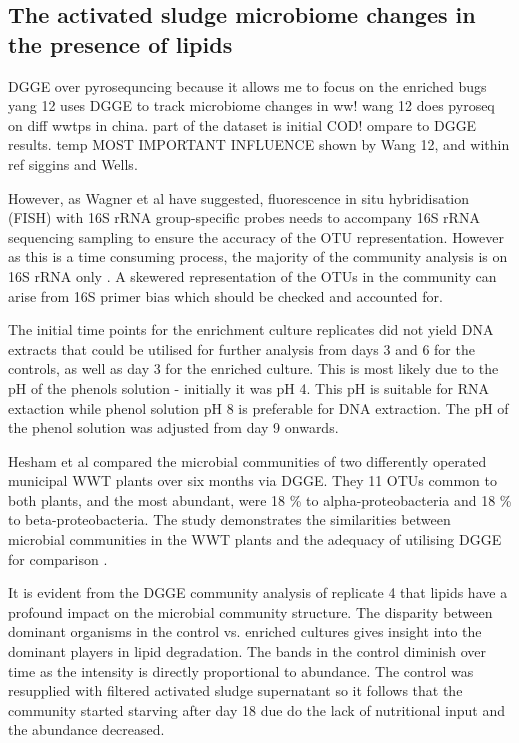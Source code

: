 \documentclass[11pt]{article}
\begin{document}
\subsection{The activated sludge microbiome changes in the presence of lipids}
DGGE over pyrosequncing because it allows me to focus on the enriched bugs
yang 12 uses DGGE to track microbiome changes in ww!
wang 12 does pyroseq on diff wwtps in china. part of the dataset is initial COD! ompare to DGGE results. temp MOST IMPORTANT INFLUENCE shown by Wang 12, and within ref siggins and Wells.

However, as Wagner et al have suggested, fluorescence in situ hybridisation (FISH) with 16S rRNA  group-specific probes needs to accompany 16S rRNA sequencing sampling to ensure the accuracy of the OTU representation. However as this is a time consuming process, the majority of the community analysis is on 16S rRNA only \cite{Wagner_02} . A skewered representation of the OTUs in the community can arise from 16S primer bias which should be checked and accounted for.

The initial time points for the enrichment culture replicates did not yield DNA extracts that could be utilised for further analysis from days 3 and 6 for the controls, as well as day 3 for the enriched culture. This is most likely due to the pH of the phenols solution - initially it was pH 4. This pH is suitable for RNA extaction while phenol solution pH 8 is preferable for DNA extraction. The pH of the phenol solution was adjusted from day 9 onwards.

Hesham et al compared the microbial communities of two differently operated municipal WWT plants over six months via DGGE. They 11 OTUs common to both plants, and the most abundant, were 18 \% to alpha-proteobacteria and 18 \% to beta-proteobacteria. The study demonstrates the similarities between microbial communities in the WWT plants and the adequacy of utilising DGGE for comparison \cite{Hesham_11}.

It is evident from the DGGE community analysis of replicate 4 that lipids have a profound impact on the microbial community structure. The disparity between dominant organisms in the control vs. enriched cultures gives insight into the dominant players in lipid degradation. The bands in the control diminish over time as the intensity is directly proportional to abundance. The control was resupplied with filtered activated sludge supernatant so it follows that the community started starving after day 18 due do the lack of nutritional input and the abundance decreased.
\end{document}

